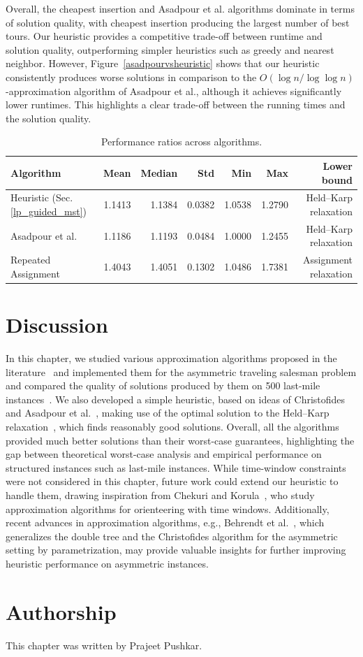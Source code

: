 \documentclass[12pt]{report}
\theoremstyle{definition}
\begin{document}
Overall, the cheapest insertion and Asadpour et al. algorithms dominate in terms of solution quality, with cheapest insertion producing the largest number of best tours. Our heuristic provides a competitive trade-off between runtime and solution quality, outperforming simpler heuristics such as greedy and nearest neighbor. However, Figure~\ref{asadpourvsheuristic} shows that our heuristic consistently produces worse solutions in comparison to the $O(\log n / \log \log n)$-approximation algorithm of Asadpour et al., although it achieves significantly lower runtimes. This highlights a clear trade-off between the running times and the solution quality.  

\begin{table}[ht]
\centering
\small
\begin{tabular}{lrrrrrr}
\toprule
Algorithm & Mean & Median & Std & Min & Max & Lower bound \\
\midrule
Heuristic (Sec. \ref{lp_guided_mst}) & 1.1413 & 1.1384 & 0.0382 & 1.0538 & 1.2790 & Held--Karp relaxation \\
Asadpour et al. & 1.1186 & 1.1193 & 0.0484 & 1.0000 & 1.2455 & Held--Karp relaxation \\
Repeated Assignment & 1.4043 & 1.4051 & 0.1302 & 1.0486 & 1.7381 & Assignment relaxation \\
\bottomrule
\end{tabular}
\caption{Performance ratios across algorithms.}
\label{tab:performance_ratios}
\end{table}

\section{Discussion}
In this chapter, we studied various approximation algorithms proposed in the literature~\cite{asadpour, frieze1982} and implemented them for the asymmetric traveling salesman problem and compared the quality of solutions produced by them on 500 last-mile instances~\cite{data}. We also developed a simple heuristic, based on ideas of Christofides~\cite{christofides1976} and Asadpour et al.~\cite{asadpour}, making use of the optimal solution to the Held--Karp relaxation~\cite{HK_relaxation}, which finds reasonably good solutions. Overall, all the algorithms provided much better solutions than their worst-case guarantees, highlighting the gap between theoretical worst-case analysis and empirical performance on structured instances such as last-mile instances. While time-window constraints were not considered in this chapter, future work could extend our heuristic to handle them, drawing inspiration from Chekuri and Korula~\cite{chekuriTW}, who study approximation algorithms for orienteering with time windows. Additionally, recent advances in approximation algorithms, e.g., Behrendt et al.~\cite{behrendt2020generalizing}, which generalizes the double tree and the Christofides algorithm for the asymmetric setting by parametrization, may provide valuable insights for further improving heuristic performance on asymmetric instances.

\vfill
\section*{Authorship}
This chapter was written by Prajeet Pushkar.



\end{document}
